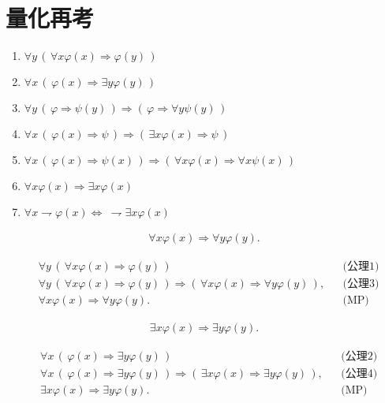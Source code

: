 \section{量化再考}
	\begin{enumerate}
		\item $\forall y\, \left(\, \forall x \varphi(x) \Longrightarrow \varphi(y)\, \right)$
		\item $\forall x\, \left(\, \varphi(x) \Longrightarrow \exists y \varphi(y)\, \right)$
		\item $\forall y\, \left(\, \varphi \Longrightarrow \psi(y)\, \right)
			\Longrightarrow \left(\, \varphi \Longrightarrow \forall y \psi(y)\, \right)$
		\item $\forall x\, \left(\, \varphi(x) \Longrightarrow \psi\, \right)
			\Longrightarrow \left(\, \exists x \varphi(x) \Longrightarrow \psi\, \right)$
		\item $\forall x\,  \left(\, \varphi(x) \Longrightarrow \psi(x)\, \right)
			\Longrightarrow \left(\, \forall x \varphi(x) \Longrightarrow \forall x \psi(x)\, \right)$
			
		\item $\forall x \varphi(x) \Longrightarrow \exists x \varphi(x)$
		\item $\forall x \rightharpoondown \varphi(x) \Longleftrightarrow
			\ \rightharpoondown \exists x \varphi(x)$
	\end{enumerate}
	
	\begin{screen}
		\begin{align}
			\forall x \varphi(x) \Longrightarrow \forall y \varphi(y).
		\end{align}
	\end{screen}
	
	\begin{align}
		&\forall y\, \left(\, \forall x \varphi(x) \Longrightarrow \varphi(y)\, \right)
		&& \mbox{(公理1)} \\
		&\forall y\, \left(\, \forall x \varphi(x) \Longrightarrow \varphi(y)\, \right)
		\Longrightarrow \left(\, \forall x \varphi(x) \Longrightarrow \forall y \varphi(y)\, \right),
		&& \mbox{(公理3)} \\
		&\forall x \varphi(x) \Longrightarrow \forall y \varphi(y).
		&& \mbox{(MP)}
	\end{align}
	
	\begin{screen}
		\begin{align}
			\exists x \varphi(x) \Longrightarrow \exists y \varphi(y).
		\end{align}
	\end{screen}
	
	\begin{align}
		&\forall x\, \left(\, \varphi(x) \Longrightarrow \exists y \varphi(y)\, \right)
		&& \mbox{(公理2)} \\
		&\forall x\, \left(\, \varphi(x) \Longrightarrow \exists y \varphi(y)\, \right)
		\Longrightarrow \left(\, \exists x \varphi(x) \Longrightarrow \exists y \varphi(y)\, \right),
		&& \mbox{(公理4)} \\
		&\exists x \varphi(x) \Longrightarrow \exists y \varphi(y).
		&& \mbox{(MP)}
	\end{align}